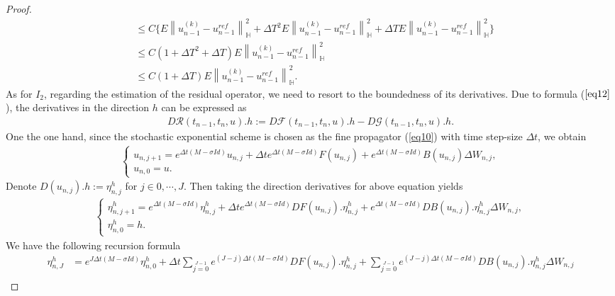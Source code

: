 \documentclass[preprint,12pt]{elsarticle}
\newtheorem{proof}{Proof}
\begin{document}
\begin{proof}
\begin{align}
		&\leq C\{ E\left\|u_{n-1}^{(k)}-u_{n-1}^{ref}\right\|_{\mathbb{H}}^2+
		\Delta T^2 E\left\|u_{n-1}^{(k)}-u_{n-1}^{ref}\right\|_{\mathbb{H}}^2+\Delta T E\left\|u_{n-1}^{(k)}-u_{n-1}^{ref}\right\|_{\mathbb{H}}^2\}\nonumber\\
		&\leq C(1+\Delta T^2+\Delta T )E\left\|u_{n-1}^{(k)}-u_{n-1}^{ref}\right\|_{\mathbb{H}}^2\nonumber\\
		&\leq C(1+\Delta T )E\left\|u_{n-1}^{(k)}-u_{n-1}^{ref}\right\|_{\mathbb{H}}^2.
	\end{align}
	As for $I_{2}$, regarding the estimation of the residual operator, we need to resort to the boundedness of its  derivatives. Due to formula ($\ref{eq12}$), the derivatives in the direction \(h\) can be expressed as 
	\begin{align}\label{eq30}
		D\mathcal{R}(t_{n-1},t_{n},u).h:=D\mathcal{F}(t_{n-1},t_{n},u).h-D\mathcal{G}(t_{n-1},t_{n},u).h.
	\end{align}
	One the one hand, since the stochastic exponential scheme is chosen as the fine propagator (\ref{eq10}) with time step-size $\Delta t$, we obtain
	\begin{align*}
		\left\{
		\begin{array}{ll}
			u _{n,j+1}=e^{\Delta t(M-\sigma Id)}u _{n,j} +\Delta t e^{\Delta t(M-\sigma Id)}F(u_{n,j})+e^{\Delta t(M-\sigma Id)}B(u_{n,j})\Delta W_{n,j},\\
			u _{n,0}=u .
		\end{array}
		\right.
	\end{align*}
	Denote  $D(u_{n,j}).h:=\eta^{h}_{n,j} $ for $j \in 0,\cdots,J$. Then  taking the direction derivatives for above equation yields
	\begin{align*}
		\left\{
		\begin{array}{ll}
			\eta _{n,j+1}^{h}=e^{\Delta t(M-\sigma Id)}\eta _{n,j}^{h} +\Delta t e^{\Delta t(M-\sigma Id)}DF(u _{n,j}).\eta _{n,j}^{h}+e^{\Delta t(M-\sigma Id)}DB(u _{n,j}).\eta _{n,j}^{h}\Delta W_{n,j},\\
			\eta _{n,0}^{h}=h .
		\end{array}
		\right.
	\end{align*}
	We have the following recursion formula
	\begin{align*}
		\eta _{n,J}^{h}&\!=\!e^{J\Delta t(M-\sigma Id)}\eta _{n,0}^{h}\!\!+\!\!\Delta t\!\sum\limits_{j=0}\limits^{J-1}\!e^{(J-j)\Delta t(M-\sigma Id)}DF(u _{n,j}).\eta _{n,j}^{h}\!\!+\!\!\sum\limits_{j=0}\limits^{J-1}\!e^{(J-j)\Delta t(M-\sigma Id)}DB(u _{n,j}).\eta _{n,j}^{h}\Delta W_{n,j}\\

\end{align*}
\end{proof}
\end{document}
